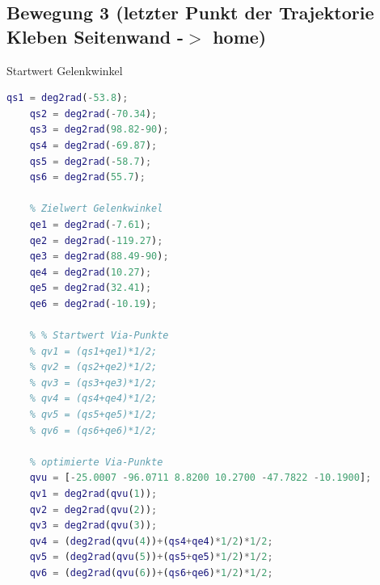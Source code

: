 \subsection{Bewegung 3 (letzter Punkt der Trajektorie Kleben Seitenwand -\ensuremath{>} home)}
%
\begin{par}
	Startwert Gelenkwinkel
\end{par} \vspace{1em}
\begin{lstlisting}[language=Matlab, numbers=none]
	qs1 = deg2rad(-53.8);
	qs2 = deg2rad(-70.34);
	qs3 = deg2rad(98.82-90);
	qs4 = deg2rad(-69.87);
	qs5 = deg2rad(-58.7);
	qs6 = deg2rad(55.7);
	
	% Zielwert Gelenkwinkel
	qe1 = deg2rad(-7.61);
	qe2 = deg2rad(-119.27);
	qe3 = deg2rad(88.49-90);
	qe4 = deg2rad(10.27);
	qe5 = deg2rad(32.41);
	qe6 = deg2rad(-10.19);
	
	% % Startwert Via-Punkte
	% qv1 = (qs1+qe1)*1/2;
	% qv2 = (qs2+qe2)*1/2;
	% qv3 = (qs3+qe3)*1/2;
	% qv4 = (qs4+qe4)*1/2;
	% qv5 = (qs5+qe5)*1/2;
	% qv6 = (qs6+qe6)*1/2;
	
	% optimierte Via-Punkte
	qvu = [-25.0007 -96.0711 8.8200 10.2700 -47.7822 -10.1900];
	qv1 = deg2rad(qvu(1));
	qv2 = deg2rad(qvu(2));
	qv3 = deg2rad(qvu(3));
	qv4 = (deg2rad(qvu(4))+(qs4+qe4)*1/2)*1/2;
	qv5 = (deg2rad(qvu(5))+(qs5+qe5)*1/2)*1/2;
	qv6 = (deg2rad(qvu(6))+(qs6+qe6)*1/2)*1/2;
\end{lstlisting}
%
